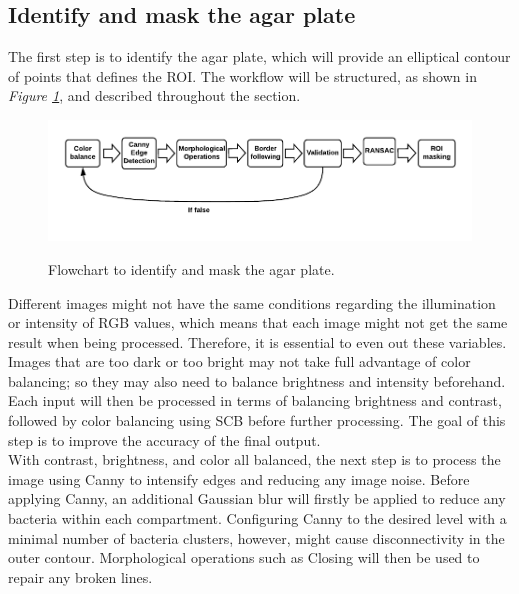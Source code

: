 \subsection{Identify and mask the agar plate}
The first step is to identify the agar plate, which will provide an elliptical contour of points that defines the ROI. The workflow will be structured, as shown in \textit{Figure \ref{fig:identify and mask flowchart}}, and described throughout the section. 
\begin{figure}[htbp]
    \centering
    \includegraphics[width=1\linewidth]{figures/PDF/Identify and mask agar plate.pdf}\\
    \caption{Flowchart to identify and mask the agar plate.}
    \label{fig:identify and mask flowchart}
\end{figure}


\noindent Different images might not have the same conditions regarding the illumination or intensity of RGB values, which means that each image might not get the same result when being processed. Therefore, it is essential to even out these variables. Images that are too dark or too bright may not take full advantage of color balancing; so they may also need to balance brightness and intensity beforehand. Each input will then be processed in terms of balancing brightness and contrast, followed by color balancing using SCB before further processing. The goal of this step is to improve the accuracy of the final output. \\

\noindent With contrast, brightness, and color all balanced, the next step is to process the image using Canny to intensify edges and reducing any image noise. Before applying Canny, an additional Gaussian blur will firstly be applied to reduce any bacteria within each compartment. Configuring Canny to the desired level with a minimal number of bacteria clusters, however, might cause disconnectivity in the outer contour. Morphological operations such as Closing will then be used to repair any broken lines. \\ 

